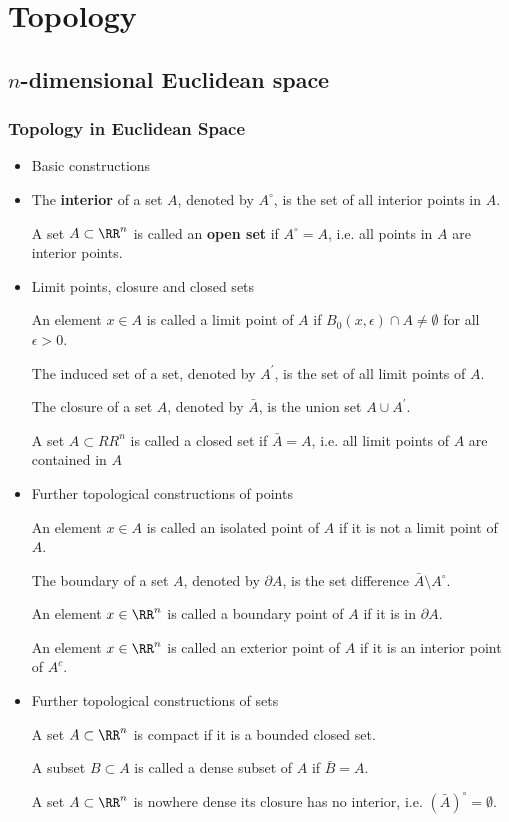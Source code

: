 \part{Topology}
\chapter{$n$-dimensional Euclidean space}
\section{Topology in Euclidean Space}
\begin{itemize}
\item Basic constructions
\item 
The \textbf{interior} of a set $A$, denoted by $A^\circ$, is the set of all interior points in $A$.

A set $A\subset\RR^n$ is called an \textbf{open set} if $A^\circ=A$, i.e. all points in $A$ are interior points.

\item Limit points, closure and closed sets

An element $x\in A$ is called a limit point of $A$ if $B_0(x,\epsilon)\cap A\neq\emptyset$ for all $\epsilon>0$.

The induced set of a set, denoted by $A^\prime$, is the set of all limit points of $A$.

The closure of a set $A$, denoted by $\bar{A}$, is the union set $A\cup A^\prime$.

A set $A\subset RR^n$ is called a closed set if $\bar{A}=A$, i.e. all limit points of $A$ are contained in $A$

\item Further topological constructions of points

An element $x\in A$ is called an isolated point of $A$ if it is not a limit point of $A$.

The boundary of a set $A$, denoted by $\partial A$, is the set difference $\bar{A}\setminus A^\circ$.

An element $x\in\RR^n$ is called a boundary point of $A$ if it is in $\partial A$.

An element $x\in\RR^n$ is called an exterior point of $A$ if it is an interior point of $A^c$.

\item Further topological constructions of sets

A set $A\subset\RR^n$ is compact if it is a bounded closed set.

A subset $B\subset A$ is called a dense subset of $A$ if $\bar{B}=A$.

A set $A\subset\RR^n$ is nowhere dense its closure has no interior, i.e. $(\bar{A})^\circ=\emptyset$.
\end{itemize}

